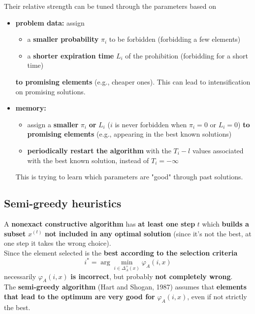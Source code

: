 Their relative strength can be tuned through the parameters based on
\begin{itemize}
	\item \textbf{problem data:} assign
	\begin{itemize}
		\item a \textbf{smaller probability} $\pi_i$ to be forbidden (forbidding a few elements)
		
		\item a \textbf{shorter expiration time} $L_i$ of the prohibition (forbidding for a short time)
	\end{itemize}
	\textbf{to promising elements} (e.g., cheaper ones). This can lead to intensification on promising solutions. \\
	
	\item \textbf{memory:}
	\begin{itemize}
		\item assign a \textbf{smaller} $\pi_i$ \textbf{or} $L_i$ ($i$ is never forbidden when $\pi_i = 0$ or $L_i = 0$) \textbf{to promising elements} (e.g., appearing in the best known solutions)
		
		\item \textbf{periodically restart the algorithm} with the $T_i - l$ values associated with the best known solution, instead of $T_i = - \infty$
	\end{itemize}
	This is trying to learn which parameters are "good" through past solutions.\\
\end{itemize}

\newpage

\subsection{Semi-greedy heuristics}
A \textbf{nonexact constructive algorithm} has \textbf{at least one step} $t$ which \textbf{builds a subset} $x^{(t)}$ \textbf{not included in any optimal solution} (since it's not the best, at one step it takes the wrong choice).\\

Since the element selected is the \textbf{best according to the selection criteria}
$$ i^\ast = \arg \min_{i \in \Delta_A^+ (x)} \varphi_A (i, x)$$
necessarily $\varphi_A (i, x)$ \textbf{is incorrect}, but probably \textbf{not completely wrong}.\\

The \textbf{semi-greedy algorithm} (Hart and Shogan, 1987) assumes that \textbf{elements that lead to the optimum are very good for} $\varphi_A (i, x)$, even if not strictly the best.\\

